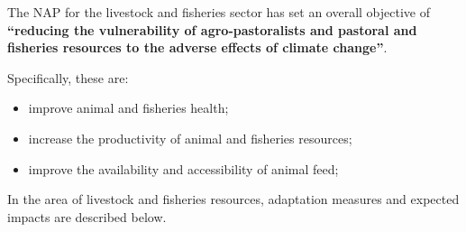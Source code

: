 \documentclass[
]{book}
\begin{document}
The NAP for the livestock and fisheries sector has set an overall objective of \textbf{``reducing the vulnerability of agro-pastoralists and pastoral and fisheries resources to the adverse effects of climate change''}.

Specifically, these are:

\begin{itemize}
\item
  improve animal and fisheries health;
\item
  increase the productivity of animal and fisheries resources;
\item
  improve the availability and accessibility of animal feed;
\end{itemize}

In the area of livestock and fisheries resources, adaptation measures and expected impacts are described below.
\end{document}
